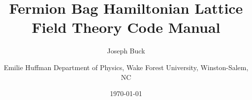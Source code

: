 \documentclass[11pt,a4paper]{article}
\begin{document}
\title{\textbf{Fermion Bag Hamiltonian Lattice Field Theory Code Manual}}
\author{
  Joseph Buck \and Emilie Huffman
  \small Department of Physics, Wake Forest University, Winston-Salem, NC
}
\date{\today}
\maketitle

\tableofcontents
\newpage















\end{document}
